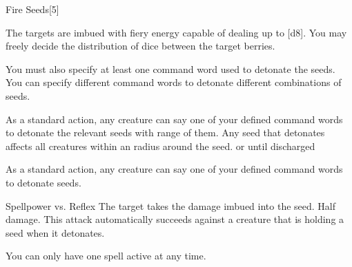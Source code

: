 \begin{spellsection}{Fire Seeds}[5]
    \begin{spellheader}
    \end{spellheader}
    \begin{spellcontent}
        \begin{spelltargetinginfo}
        \end{spelltargetinginfo}
        \begin{spelleffects}
            \spelleffect The targets are imbued with fiery energy capable of dealing up to [d8]. You may freely decide the distribution of dice between the target berries.

            You must also specify at least one command word used to detonate the seeds. You can specify different command words to detonate different combinations of seeds.

            As a standard action, any creature can say one of your defined command words to detonate the relevant seeds with \rngmed range of them. Any seed that detonates affects all creatures within an \areasmall radius around the seed.
            \spelldur \durext or until discharged
        \end{spelleffects}
    \end{spellcontent}
    \begin{spellsubcontent}
        \begin{spelltargetinginfo}
            \spellspecial As a standard action, any creature can say one of your defined command words to detonate seeds.
            \spellrng{\rngmed}
        \end{spelltargetinginfo}
        \begin{spelleffects}
            \begin{spellattack}{Spellpower vs. Reflex}
                \spellsuccess The target takes the damage imbued into the seed.
                \spellfailure Half damage.
                \spellspecial This attack automatically succeeds against a creature that is holding a seed when it detonates.
            \end{spellattack}
        \end{spelleffects}
    \end{spellsubcontent}
    \begin{spellfooter}
        \spellnotes You can only have one  spell active at any time.
        \miscastexplode
    \end{spellfooter}
\end{spellsection}

